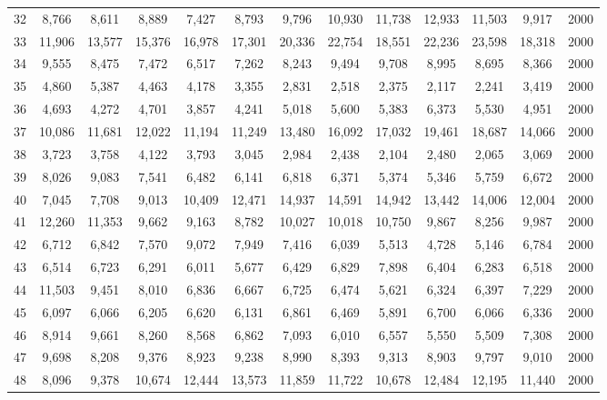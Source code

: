 {\begin{longtable}{ >{\footnotesize}ccccccccccccc}
32  & 8,766  & 8,611  & 8,889  & 7,427  & 8,793  & 9,796  & 10,930 & 11,738 & 12,933 & 11,503 & 9,917  & 2000 \\
33  & 11,906 & 13,577 & 15,376 & 16,978 & 17,301 & 20,336 & 22,754 & 18,551 & 22,236 & 23,598 & 18,318 & 2000 \\
34  & 9,555  & 8,475  & 7,472  & 6,517  & 7,262  & 8,243  & 9,494  & 9,708  & 8,995  & 8,695  & 8,366  & 2000 \\
35  & 4,860  & 5,387  & 4,463  & 4,178  & 3,355  & 2,831  & 2,518  & 2,375  & 2,117  & 2,241  & 3,419  & 2000 \\
36  & 4,693  & 4,272  & 4,701  & 3,857  & 4,241  & 5,018  & 5,600  & 5,383  & 6,373  & 5,530  & 4,951  & 2000 \\
37  & 10,086 & 11,681 & 12,022 & 11,194 & 11,249 & 13,480 & 16,092 & 17,032 & 19,461 & 18,687 & 14,066 & 2000 \\
38  & 3,723  & 3,758  & 4,122  & 3,793  & 3,045  & 2,984  & 2,438  & 2,104  & 2,480  & 2,065  & 3,069  & 2000 \\
39  & 8,026  & 9,083  & 7,541  & 6,482  & 6,141  & 6,818  & 6,371  & 5,374  & 5,346  & 5,759  & 6,672  & 2000 \\
40  & 7,045  & 7,708  & 9,013  & 10,409 & 12,471 & 14,937 & 14,591 & 14,942 & 13,442 & 14,006 & 12,004 & 2000 \\
41  & 12,260 & 11,353 & 9,662  & 9,163  & 8,782  & 10,027 & 10,018 & 10,750 & 9,867  & 8,256  & 9,987  & 2000 \\
42  & 6,712  & 6,842  & 7,570  & 9,072  & 7,949  & 7,416  & 6,039  & 5,513  & 4,728  & 5,146  & 6,784  & 2000 \\
43  & 6,514  & 6,723  & 6,291  & 6,011  & 5,677  & 6,429  & 6,829  & 7,898  & 6,404  & 6,283  & 6,518  & 2000 \\
44  & 11,503 & 9,451  & 8,010  & 6,836  & 6,667  & 6,725  & 6,474  & 5,621  & 6,324  & 6,397  & 7,229  & 2000 \\
45  & 6,097  & 6,066  & 6,205  & 6,620  & 6,131  & 6,861  & 6,469  & 5,891  & 6,700  & 6,066  & 6,336  & 2000 \\
46  & 8,914  & 9,661  & 8,260  & 8,568  & 6,862  & 7,093  & 6,010  & 6,557  & 5,550  & 5,509  & 7,308  & 2000 \\
47  & 9,698  & 8,208  & 9,376  & 8,923  & 9,238  & 8,990  & 8,393  & 9,313  & 8,903  & 9,797  & 9,010  & 2000 \\
48  & 8,096  & 9,378  & 10,674 & 12,444 & 13,573 & 11,859 & 11,722 & 10,678 & 12,484 & 12,195 & 11,440 & 2000 \\

\end{longtable}}
